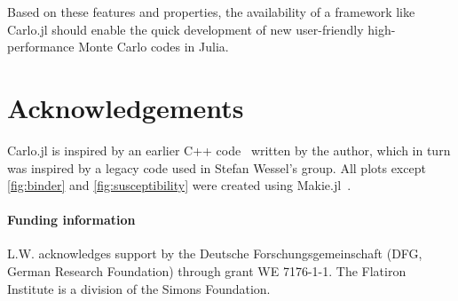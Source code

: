 \documentclass{SciPost}
\begin{document}
Based on these features and properties, the availability of a framework like Carlo.jl should enable the quick development of new user-friendly high-performance Monte Carlo codes in Julia.
\section*{Acknowledgements}
Carlo.jl is inspired by an earlier C++ code~\cite{loadleveller} written by the author, which in turn was inspired by a legacy code used in Stefan Wessel's group.
All plots except \cref{fig:binder} and \cref{fig:susceptibility} were created using Makie.jl~\cite{DanischKrumbiegel2021}.

\paragraph{Funding information}
L.W. acknowledges support by the Deutsche Forschungsgemeinschaft (DFG, German Research Foundation) through grant WE 7176-1-1.
The Flatiron Institute is a division of the Simons Foundation.
\begin{appendix}
\end{appendix}



\end{document}
